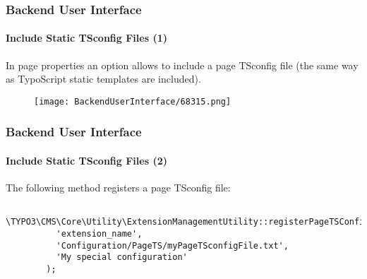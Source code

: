 \begin{frame}[fragile]
	\frametitle{Backend User Interface}
	\framesubtitle{Include Static TSconfig Files (1)}

	In page properties an option allows to include a page TSconfig file
	(the same way as TypoScript static templates are included).

	\begin{figure}
		\texttt{[image: BackendUserInterface/68315.png]}
	\end{figure}

\end{frame}

\begin{frame}[fragile]
	\frametitle{Backend User Interface}
	\framesubtitle{Include Static TSconfig Files (2)}

	\lstset{basicstyle=\tiny\ttfamily}

	The following method registers a page TSconfig file:

	\begin{lstlisting}
		\TYPO3\CMS\Core\Utility\ExtensionManagementUtility::registerPageTSConfigFile(
		  'extension_name',
		  'Configuration/PageTS/myPageTSconfigFile.txt',
		  'My special configuration'
		);
	\end{lstlisting}

\end{frame}


